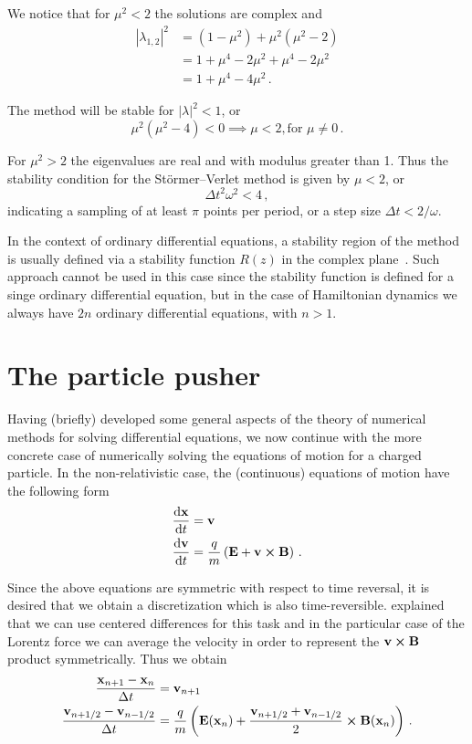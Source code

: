 \documentclass[12pt, class=report, crop=false]{standalone}
\begin{document}
We notice that for \(\mu^2 < 2\) the solutions are complex and
\begin{align*}
  |\lambda_{1,2}|^2 &= (1-\mu^2) + \mu^2 (\mu^2-2) \\
  &= 1+\mu^4-2\mu^2+\mu^4-2\mu^2 \\
  &= 1+\mu^4-4\mu^2\,.
\end{align*}

The method will be stable for \(|\lambda|^2 < 1\), or
\[
\mu^2 (\mu^2 - 4) < 0 \implies \mu < 2, \text{for } \mu \ne 0\,.
\]

For \(\mu^2 > 2\) the eigenvalues are real and with modulus greater than 1.
Thus the stability condition for the Störmer–Verlet method is given by \(\mu < 2\),
or
\[
\Delta t^2 \omega^2 < 4\,,
\]
indicating a sampling of at least \(\pi\) points per period, or a step size
\(\Delta t < 2/\omega\).

In the context of ordinary differential equations, a stability region of the method
is usually defined via a stability function \(R(z)\) in the complex
plane~\autocite[81]{butcher_numericalmethods_2016}. Such approach cannot be used
in this case since the stability function is defined for a singe ordinary
differential equation, but in the case of Hamiltonian dynamics we always have
\(2n\) ordinary differential equations, with \(n>1\).

\section{The particle pusher}

Having (briefly) developed some general aspects of the theory of numerical methods
for solving differential equations, we now continue with the more concrete case
of numerically solving the equations of motion for a charged particle.
In the non-relativistic case, the (continuous) equations of motion have the
following form
\begin{align*}
  \dv{\vb{x}}{t} &= \vb{v} \\
  \dv{\vb{v}}{t} &= \frac{q}{m} \left(\vb{E} + \vb{v}\cp\vb{B}\right)\,.
\end{align*}

Since the above equations are symmetric with respect to time reversal, it is
desired that we obtain a discretization which is also time-reversible.
\Textcite{buneman_timereversibledifference_1967} explained that we can
use centered differences for this task and in the particular case of the
Lorentz force we can average the velocity in order to represent the
\(\vb{v} \cp \vb{B}\) product symmetrically. Thus we obtain
\begin{subequations}
  \begin{align}
    \label{eq:lorentz-discrete-x}
    \frac{\vb{x}_{n+1}-\vb{x}_n}{\Delta t} &= \vb{v}_{n+1} \\
    \label{eq:lorentz-discrete-v}
    \frac{\vb{v}_{n+1/2}-\vb{v}_{n-1/2}}{\Delta t} &= \frac{q}{m}
      \left(\vb{E}(\vb{x}_n) + \frac{\vb{v}_{n+1/2}+\vb{v}_{n-1/2}}{2} \cp \vb{B}(\vb{x}_n)\right)\,.
  \end{align}
\end{subequations}
\end{document}
